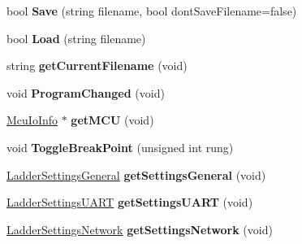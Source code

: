\begin{DoxyCompactItemize}
\item 
\hypertarget{class_ladder_diagram_afb387a8560a9c9c5d390087b95a6a541}{bool {\bfseries Save} (string filename, bool dont\-Save\-Filename=false)}\label{class_ladder_diagram_afb387a8560a9c9c5d390087b95a6a541}

\item 
\hypertarget{class_ladder_diagram_a482e5850f545f9bc4d0966321be78c03}{bool {\bfseries Load} (string filename)}\label{class_ladder_diagram_a482e5850f545f9bc4d0966321be78c03}

\item 
\hypertarget{class_ladder_diagram_a02c8eb2ff9cedfd023463a842e10c7fd}{string {\bfseries get\-Current\-Filename} (void)}\label{class_ladder_diagram_a02c8eb2ff9cedfd023463a842e10c7fd}

\item 
\hypertarget{class_ladder_diagram_a2e7cb76665821bce88e255b654303b71}{void {\bfseries Program\-Changed} (void)}\label{class_ladder_diagram_a2e7cb76665821bce88e255b654303b71}

\item 
\hypertarget{class_ladder_diagram_a53729a521a2ff88ae078c74e50ae6a82}{\hyperlink{struct_mcu_io_info_tag}{Mcu\-Io\-Info} $\ast$ {\bfseries get\-M\-C\-U} (void)}\label{class_ladder_diagram_a53729a521a2ff88ae078c74e50ae6a82}

\item 
\hypertarget{class_ladder_diagram_a6e2de735f45b6cd06813e6aa440a0627}{void {\bfseries Toggle\-Break\-Point} (unsigned int rung)}\label{class_ladder_diagram_a6e2de735f45b6cd06813e6aa440a0627}

\item 
\hypertarget{class_ladder_diagram_a2a759cbb91062e086641024f1c864193}{\hyperlink{struct_ladder_settings_general}{Ladder\-Settings\-General} {\bfseries get\-Settings\-General} (void)}\label{class_ladder_diagram_a2a759cbb91062e086641024f1c864193}

\item 
\hypertarget{class_ladder_diagram_a3f1f5e176d568db09ab2704947f2f6d0}{\hyperlink{struct_ladder_settings_u_a_r_t}{Ladder\-Settings\-U\-A\-R\-T} {\bfseries get\-Settings\-U\-A\-R\-T} (void)}\label{class_ladder_diagram_a3f1f5e176d568db09ab2704947f2f6d0}

\item 
\hypertarget{class_ladder_diagram_a6cb4a103ca3ffd125a0d6f354790bdb8}{\hyperlink{struct_ladder_settings_network}{Ladder\-Settings\-Network} {\bfseries get\-Settings\-Network} (void)}\label{class_ladder_diagram_a6cb4a103ca3ffd125a0d6f354790bdb8}


\end{DoxyCompactItemize}
